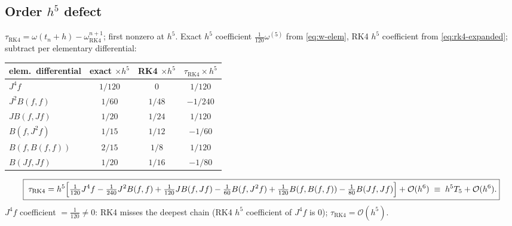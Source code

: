 \documentclass[11pt]{article}
\newcommand{\bO}{\mathcal{O}}
\begin{document}
\subsection{Order $h^5$ defect}
$\tau_{\mathrm{RK4}}=\omega(t_n+h)-\omega^{n+1}_{\mathrm{RK4}}$; first nonzero at $h^5$.
Exact $h^5$ coefficient $\tfrac{1}{120}\omega^{(5)}$ from \eqref{eq:w-elem}, RK4 $h^5$
coefficient from \eqref{eq:rk4-expanded}; subtract per elementary differential:
\begin{center}
\small
\renewcommand{\arraystretch}{1.35}
\begin{tabular}{lccc}
\toprule
elem.\ differential & exact $\times h^5$ & RK4 $\times h^5$ & $\tau_{\mathrm{RK4}}\times h^5$ \\
\midrule
$J^4f$        & $1/120$ & $0$    & $1/120$ \\
$J^2B(f,f)$   & $1/60$  & $1/48$ & $-1/240$ \\
$JB(f,Jf)$    & $1/20$  & $1/24$ & $1/120$ \\
$B(f,J^2f)$   & $1/15$  & $1/12$ & $-1/60$ \\
$B(f,B(f,f))$ & $2/15$  & $1/8$  & $1/120$ \\
$B(Jf,Jf)$    & $1/20$  & $1/16$ & $-1/80$ \\
\bottomrule
\end{tabular}
\end{center}
\begin{equation}
  \boxed{\;
  \tau_{\mathrm{RK4}} = h^5\Bigl[
    \tfrac{1}{120}J^4f
    - \tfrac{1}{240}J^2B(f,f)
    + \tfrac{1}{120}JB(f,Jf)
    - \tfrac{1}{60}B(f,J^2f)
    + \tfrac{1}{120}B(f,B(f,f))
    - \tfrac{1}{80}B(Jf,Jf)
  \Bigr] + \bO(h^6)
  \;\equiv\; h^5 T_5 + \bO(h^6).}
  \label{eq:rk4-lte}
\end{equation}
$J^4f$ coefficient $=\tfrac{1}{120}\ne0$: RK4 misses the deepest chain (RK4 $h^5$
coefficient of $J^4f$ is $0$); $\tau_{\mathrm{RK4}}=\bO(h^5)$.

\end{document}
